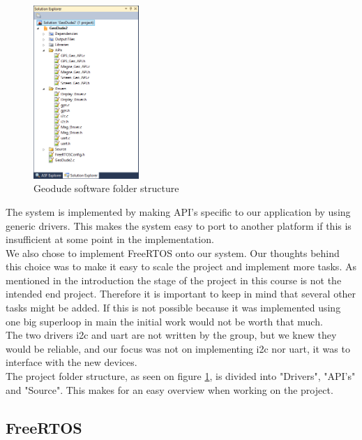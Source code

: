 \begin{figure}
\vspace{-30pt}
\begin{center}
\includegraphics[width=4cm]{billeder/folder_structure}
\end{center}
\vspace{-20pt}
\caption{Geodude software folder structure}
\vspace{-20pt}
\label{fig:fold_structure}
\end{figure}
The system is implemented by making API's specific to our application by using generic drivers. This makes the system easy to port to another platform if this is insufficient at some point in the implementation.\\
We also chose to implement FreeRTOS onto our system. Our thoughts behind this choice was to make it easy to scale the project and implement more tasks. As mentioned in the introduction the stage of the project in this course is not the intended end project. Therefore it is important to keep in mind that several other tasks might be added. If this is not possible because it was implemented using one big superloop in main the initial work would not be worth that much.\\
The two drivers i2c and uart are not written by the group, but we knew they would be reliable, and our focus was not on implementing i2c nor uart, it was to interface with the new devices.\\
The project folder structure, as seen on figure \ref{fig:fold_structure}, is divided into "Drivers", "API's" and "Source". This makes for an easy overview when working on the project.\\

\subsection{FreeRTOS}
